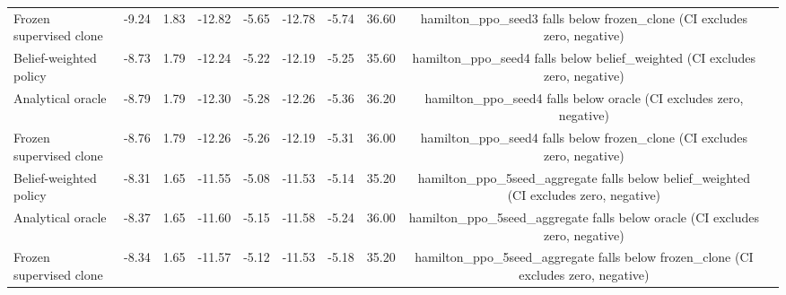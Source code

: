 \begin{table}
\begin{tabular}{lccccccccl}
Frozen supervised clone & -9.24 & 1.83 & -12.82 & -5.65 & -12.78 & -5.74 & 36.60 & hamilton\_ppo\_seed3 falls below frozen\_clone (CI excludes zero, negative) \\
Belief-weighted policy & -8.73 & 1.79 & -12.24 & -5.22 & -12.19 & -5.25 & 35.60 & hamilton\_ppo\_seed4 falls below belief\_weighted (CI excludes zero, negative) \\
Analytical oracle & -8.79 & 1.79 & -12.30 & -5.28 & -12.26 & -5.36 & 36.20 & hamilton\_ppo\_seed4 falls below oracle (CI excludes zero, negative) \\
Frozen supervised clone & -8.76 & 1.79 & -12.26 & -5.26 & -12.19 & -5.31 & 36.00 & hamilton\_ppo\_seed4 falls below frozen\_clone (CI excludes zero, negative) \\
Belief-weighted policy & -8.31 & 1.65 & -11.55 & -5.08 & -11.53 & -5.14 & 35.20 & hamilton\_ppo\_5seed\_aggregate falls below belief\_weighted (CI excludes zero, negative) \\
Analytical oracle & -8.37 & 1.65 & -11.60 & -5.15 & -11.58 & -5.24 & 36.00 & hamilton\_ppo\_5seed\_aggregate falls below oracle (CI excludes zero, negative) \\
Frozen supervised clone & -8.34 & 1.65 & -11.57 & -5.12 & -11.53 & -5.18 & 35.20 & hamilton\_ppo\_5seed\_aggregate falls below frozen\_clone (CI excludes zero, negative) \\
\bottomrule
\end{tabular}
\end{table}
